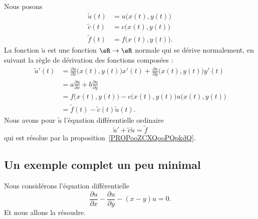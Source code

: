 Nous posons
\begin{subequations}
	\begin{align}
		\tilde u(t) & =u\big( x(t),y(t) \big)  \\
		\tilde c(t) & =c\big( x(t),y(t) \big)  \\
		\tilde f(t) & =f\big( x(t),y(t) \big).
	\end{align}
\end{subequations}
La fonction \( \tilde u\) est une fonction \( \eR\to \eR\) normale qui se dérive normalement, en suivant la règle de dérivation des fonctions composées :
\begin{subequations}
	\begin{align}
		\tilde u'(t) & =\frac{ \partial u }{ \partial x }\big( x(t),y(t) \big)x'(t)+\frac{ \partial u }{ \partial y }\big( x(t),y(t) \big)y'(t) \\
		             & =a\frac{ \partial u }{ \partial x }+b\frac{ \partial u }{ \partial y }                                                   \\
		             & =f\big( x(t),y(t) \big)-c\big( x(t),y(t) \big)u\big( x(t),y(t) \big)                                                     \\
		             & =\tilde f(t)-\tilde c(t)\tilde u(t).
	\end{align}
\end{subequations}
Nous avons pour \( \tilde u\) l'équation différentielle ordinaire
\begin{equation}
	\tilde u'+\tilde c\tilde u=\tilde f
\end{equation}
qui est résolue par la proposition~\ref{PROPooZCXQooPQpkdQ}.

\subsection{Un exemple complet un peu minimal}

Nous considérons l'équation différentielle\cite{ooEIHMooRXOzwa}
\begin{equation}
	\frac{ \partial u }{ \partial x }-\frac{ \partial u }{ \partial y }-(x-y)u=0.
\end{equation}
Et nous allons la résoudre.

